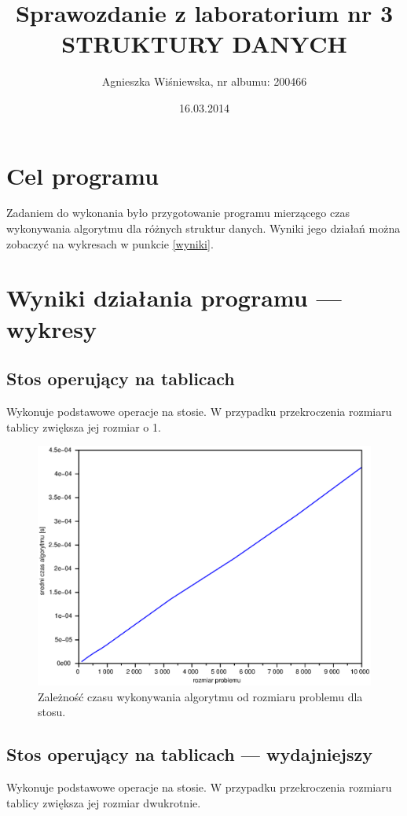 \documentclass{mwart}
\title{\Huge{Sprawozdanie z laboratorium nr 3 \\
STRUKTURY DANYCH}}
\author{Agnieszka Wiśniewska, nr albumu: 200466}
\date{16.03.2014}
\begin{document}
\maketitle

\section{Cel programu\label{wstep}}

Zadaniem do wykonania było przygotowanie programu mierzącego czas wykonywania algorytmu dla różnych struktur danych. Wyniki jego działań można zobaczyć na wykresach w punkcie \ref{wyniki}.

\section{Wyniki działania programu --- wykresy\label{wyniki}}
\subsection {Stos operujący na tablicach}
Wykonuje podstawowe operacje na stosie. W przypadku przekroczenia rozmiaru tablicy zwiększa jej rozmiar o 1.

\begin{figure}[!htp]
\centering
\includegraphics[width=\textwidth]{files/stack.eps}
\caption{Zależność czasu wykonywania algorytmu od rozmiaru problemu dla stosu. \label{stack}} 
\end{figure}

\newpage
\subsection {Stos operujący na tablicach --- wydajniejszy}
Wykonuje podstawowe operacje na stosie. W przypadku przekroczenia rozmiaru tablicy zwiększa jej rozmiar dwukrotnie.
\end{document}
